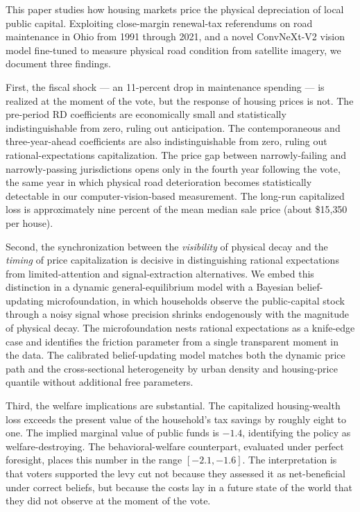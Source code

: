 This paper studies how housing markets price the physical depreciation of local public capital. Exploiting close-margin renewal-tax referendums on road maintenance in Ohio from 1991 through 2021, and a novel ConvNeXt-V2 vision model fine-tuned to measure physical road condition from satellite imagery, we document three findings.

First, the fiscal shock --- an 11-percent drop in maintenance spending --- is realized at the moment of the vote, but the response of housing prices is not. The pre-period RD coefficients are economically small and statistically indistinguishable from zero, ruling out anticipation. The contemporaneous and three-year-ahead coefficients are also indistinguishable from zero, ruling out rational-expectations capitalization. The price gap between narrowly-failing and narrowly-passing jurisdictions opens only in the fourth year following the vote, the same year in which physical road deterioration becomes statistically detectable in our computer-vision-based measurement. The long-run capitalized loss is approximately nine percent of the mean median sale price (about \$15{,}350 per house).

Second, the synchronization between the {\it visibility} of physical decay and the {\it timing} of price capitalization is decisive in distinguishing rational expectations from limited-attention and signal-extraction alternatives. We embed this distinction in a dynamic general-equilibrium model with a Bayesian belief-updating microfoundation, in which households observe the public-capital stock through a noisy signal whose precision shrinks endogenously with the magnitude of physical decay. The microfoundation nests rational expectations as a knife-edge case and identifies the friction parameter from a single transparent moment in the data. The calibrated belief-updating model matches both the dynamic price path and the cross-sectional heterogeneity by urban density and housing-price quantile without additional free parameters.

Third, the welfare implications are substantial. The capitalized housing-wealth loss exceeds the present value of the household's tax savings by roughly eight to one. The implied marginal value of public funds is $-1.4$, identifying the policy as welfare-destroying. The behavioral-welfare counterpart, evaluated under perfect foresight, places this number in the range $[-2.1, -1.6]$. The interpretation is that voters supported the levy cut not because they assessed it as net-beneficial under correct beliefs, but because the costs lay in a future state of the world that they did not observe at the moment of the vote.

